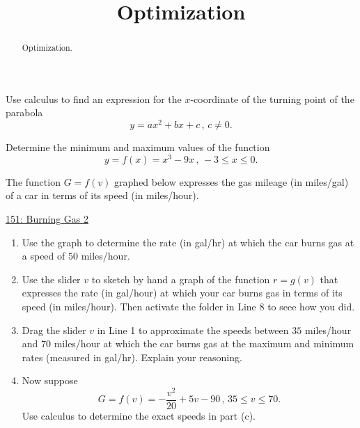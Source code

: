 \documentclass{ximera}
\title{Optimization}
\begin{document}
\begin{abstract}
Optimization.
\end{abstract}
\maketitle


\begin{question} \label{QOepREPER}
Use calculus to find an expression for the $x$-coordinate of the turning point of the parabola
\[
    y = ax^2 + bx + c \, , \, c\neq 0.
\]
\end{question}

\begin{question} \label{Q545hhghnnggZ}
Determine the minimum and maximum values of the function
\[
     y = f(x) = x^3 - 9x \, , \, -3\leq x \leq 0 .
\]
\end{question}

\begin{question} \label{Q5hdfhgeyghhg}
The function $G=f(v)$ graphed below expresses the gas mileage (in miles/gal) of a car in terms of its speed (in miles/hour).
  

\begin{onlineOnly}
    \begin{center}
\end{center}
\end{onlineOnly}

\href{https://www.desmos.com/calculator/bcj0k1fymu}{151: Burning Gas 2}

\begin{enumerate}
\item Use the graph to determine the rate (in gal/hr) at which the car burns gas at a speed of $50$ miles/hour.

\item Use the slider $v$ to sketch by hand a graph of the function $r=g(v)$ that expresses the rate (in gal/hour) at which your car burns gas in terms of its speed (in miles/hour). Then activate the folder in Line 8 to seee how you did.

\item Drag the slider $v$ in Line 1 to approximate the speeds between $35$ miles/hour and $70$ miles/hour at which the car burns gas at the maximum and minimum rates (measured in gal/hr). Explain your reasoning.

\item Now suppose
\[
     G = f(v) = -\frac{v^2}{20} + 5v -90 \, , \, 35\leq v \leq 70 .
\]
Use calculus to determine the exact speeds in part (c). %

\end{enumerate}
\end{question}
\end{document}
